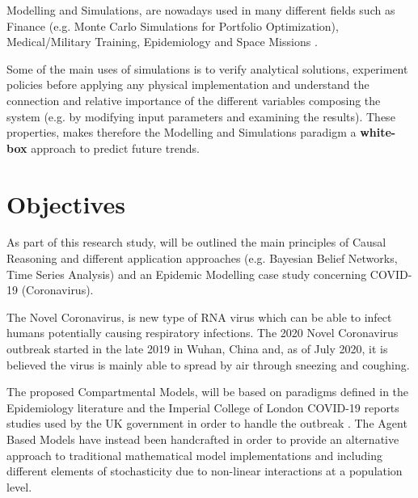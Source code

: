 Modelling and Simulations, are nowadays used in many different fields such as Finance (e.g. Monte Carlo Simulations for Portfolio Optimization), Medical/Military Training, Epidemiology and Space Missions \cite{mod_2, mod_3}. 

Some of the main uses of simulations is to verify analytical solutions, experiment policies before applying any physical implementation and understand the connection and relative importance of the different variables composing the system (e.g. by modifying input parameters and examining the results). These properties, makes therefore the Modelling and Simulations paradigm a \textbf{white-box} approach to predict future trends.

\section{Objectives}
\vspace{-0.1cm}
As part of this research study, will be outlined the main principles of Causal Reasoning and different application approaches (e.g. Bayesian Belief Networks, Time Series Analysis) and an Epidemic Modelling case study concerning COVID-19 (Coronavirus). 

The Novel Coronavirus, is new type of RNA virus which can be able to infect humans potentially causing respiratory infections. The 2020 Novel Coronavirus outbreak started in the late 2019 in Wuhan, China and, as of July 2020, it is believed the virus is mainly able to spread by air through sneezing and coughing. 

The proposed Compartmental Models, will be based on paradigms defined in the Epidemiology literature and the Imperial College of London COVID-19 reports studies used by the UK government in order to handle the outbreak \cite{mod_4}. The Agent Based Models have instead been handcrafted in order to provide an alternative approach to traditional mathematical model implementations and including different elements of stochasticity due to non-linear interactions at a population level. 